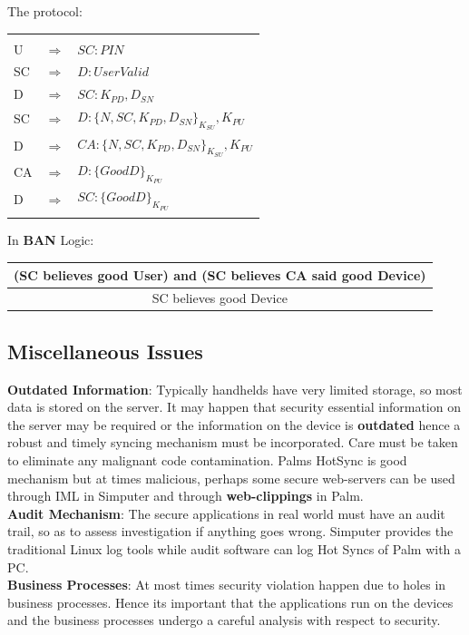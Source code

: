 \documentclass[11pt]{article}
\begin{document}
The protocol:

\begin{center}
\begin{tabular}{|lll|}
\hline
 & & \\
U & $\Rightarrow $ & $ SC: PIN $ \\
SC & $\Rightarrow $ & $ D: User Valid $\\
D & $\Rightarrow $ & $ SC: K_{PD}, D_{SN}$ \\
SC & $\Rightarrow $ &  $ D: \{N, SC, K_{PD}, D_{SN}\}_{K_{SU}}, K_{PU}$ \\
D & $\Rightarrow $ & $ CA: \{N, SC, K_{PD}, D_{SN}\}_{K_{SU}}, K_{PU}$ \\
CA & $\Rightarrow $ & $ D: \{Good D\}_{K_{PU}}$ \\
D & $\Rightarrow $ & $ SC: \{Good D\}_{K_{PU}}$ \\
 & & \\
\hline
\end{tabular}
\end{center}

In {\bf BAN} \cite{abadi} Logic:
\begin{center}
\begin{tabular}{c}
(SC believes good User) and (SC believes CA said good Device)\\
\hline
SC believes good Device \\
\end{tabular}
\end{center}

\subsection{Miscellaneous Issues}
{\bf Outdated Information}: Typically handhelds have very limited storage, so most data is stored on the server. It may happen that security essential information on the server may be required or the information on the device is {\bf outdated} hence a robust and timely syncing mechanism must be incorporated. Care must be taken to eliminate any malignant code contamination. Palms HotSync is good mechanism but at times malicious, perhaps some secure web-servers can be used through IML in Simputer and through {\bf web-clippings} in Palm.\\
{\bf Audit Mechanism}: The secure applications in real world must have an audit trail, so as to assess investigation if anything goes wrong. Simputer provides the traditional Linux log tools while audit software can log Hot Syncs of Palm with a PC.\\
{\bf Business Processes}: At most times security violation happen due to holes in business processes. Hence its important that the applications run on the devices and the business processes undergo a careful analysis with respect to security.
\end{document}

